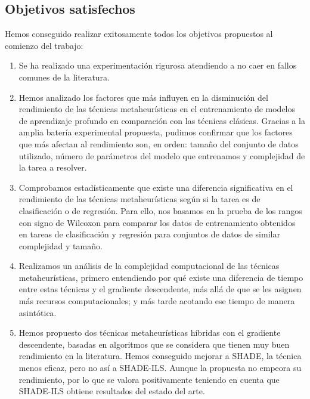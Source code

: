 \subsection{Objetivos satisfechos}

Hemos conseguido realizar exitosamente todos los objetivos propuestos al comienzo del trabajo:

\begin{enumerate}
	\item Se ha realizado una experimentación rigurosa atendiendo a no caer en fallos comunes de la literatura. 

	\item Hemos analizado los factores que más influyen en la disminución del rendimiento de las técnicas metaheurísticas en el entrenamiento de modelos de aprendizaje profundo en comparación con las técnicas clásicas. Gracias a la amplia batería experimental propuesta, pudimos confirmar que los factores que más afectan al rendimiento son, en orden: tamaño del conjunto de datos utilizado, número de parámetros del modelo que entrenamos y complejidad de la tarea a resolver.
	
	\item Comprobamos estadísticamente que existe una diferencia significativa en el rendimiento de las técnicas metaheurísticas según si la tarea es de clasificación o de regresión. Para ello, nos basamos en la prueba de los rangos con signo de Wilcoxon para comparar los datos de entrenamiento obtenidos en tareas de clasificación y regresión para conjuntos de datos de similar complejidad y tamaño.
	
	\item Realizamos un análisis de la complejidad computacional de las técnicas metaheurísticas, primero entendiendo por qué existe una diferencia de tiempo entre estas técnicas y el gradiente descendente, más allá de que se les asignen más recursos computacionales; y más tarde acotando ese tiempo de manera asintótica.
	
	\item Hemos propuesto dos técnicas metaheurísticas híbridas con el gradiente descendente, basadas en algoritmos que se considera que tienen muy buen rendimiento en la literatura. Hemos conseguido mejorar a SHADE, la técnica menos eficaz, pero no así a SHADE-ILS. Aunque la propuesta no empeora su rendimiento, por lo que se valora positivamente teniendo en cuenta que SHADE-ILS obtiene resultados del estado del arte.
\end{enumerate}

